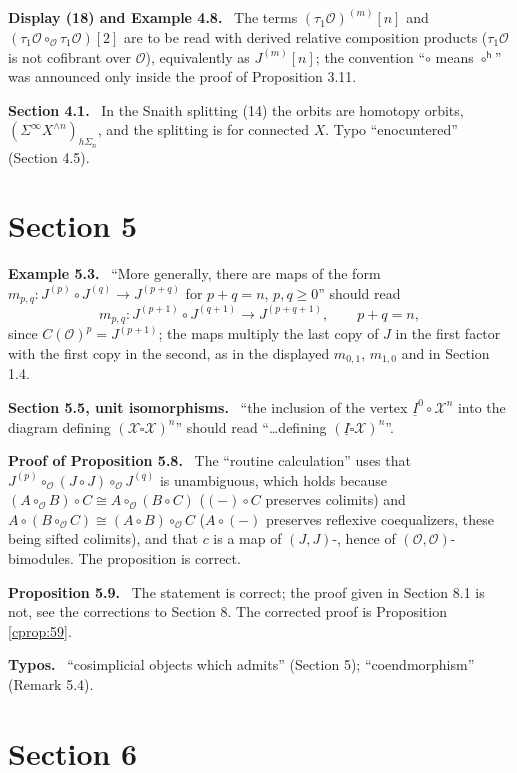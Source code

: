 \documentclass[12pt]{article}
\theoremstyle{plain}
\theoremstyle{definition}
\theoremstyle{remark}
\newcommand{\Cal}[1]{\mathcal{#1}}
\newcommand{\boxcirc}{\mathring{\square}}
\newcommand{\corr}[1]{\par\smallskip\noindent\textbf{#1.}\ }
\begin{document}
\corr{Display (18) and Example 4.8} The terms $(\tau_1\Cal O)^{(m)}[n]$ and $(\tau_1\Cal O\circ_{\Cal O}\tau_1\Cal O)[2]$ are to be read with derived relative composition products ($\tau_1\Cal O$ is not cofibrant over $\Cal O$), equivalently as $J^{(m)}[n]$; the convention ``$\circ$ means $\circ^{\mathsf h}$'' was announced only inside the proof of Proposition 3.11.

\corr{Section 4.1} In the Snaith splitting (14) the orbits are homotopy orbits, $(\Sigma^\infty X^{\wedge n})_{h\Sigma_n}$, and the splitting is for connected $X$. Typo ``enocuntered'' (Section 4.5).

\section*{Section 5}
\label{sec:s5}

\corr{Example 5.3} ``More generally, there are maps of the form $m_{p,q}\colon J^{(p)}\circ J^{(q)}\to J^{(p+q)}$ for $p+q=n$, $p,q\geq0$'' should read
\[m_{p,q}\colon J^{(p+1)}\circ J^{(q+1)}\longrightarrow J^{(p+q+1)},\qquad p+q=n,\]
since $C(\Cal O)^p=J^{(p+1)}$; the maps multiply the last copy of $J$ in the first factor with the first copy in the second, as in the displayed $m_{0,1}$, $m_{1,0}$ and in Section 1.4.

\corr{Section 5.5, unit isomorphisms} ``the inclusion of the vertex $\underline I^0\circ\Cal X^n$ into the diagram defining $(\Cal X\boxcirc\Cal X)^n$'' should read ``\dots defining $(\underline I\boxcirc\Cal X)^n$''.

\corr{Proof of Proposition 5.8} The ``routine calculation'' uses that $J^{(p)}\circ_{\Cal O}(J\circ J)\circ_{\Cal O}J^{(q)}$ is unambiguous, which holds because $(A\circ_{\Cal O}B)\circ C\cong A\circ_{\Cal O}(B\circ C)$ ($(-)\circ C$ preserves colimits) and $A\circ(B\circ_{\Cal O}C)\cong(A\circ B)\circ_{\Cal O}C$ ($A\circ(-)$ preserves reflexive coequalizers, these being sifted colimits), and that $c$ is a map of $(J,J)$-, hence of $(\Cal O,\Cal O)$-bimodules. The proposition is correct.

\corr{Proposition 5.9} The statement is correct; the proof given in Section 8.1 is not, see the corrections to Section 8. The corrected proof is Proposition \ref{cprop:59}.

\corr{Typos} ``cosimplicial objects which admits'' (Section 5); ``coendmorphism'' (Remark 5.4).

\section*{Section 6}
\label{sec:s6}
\end{document}
